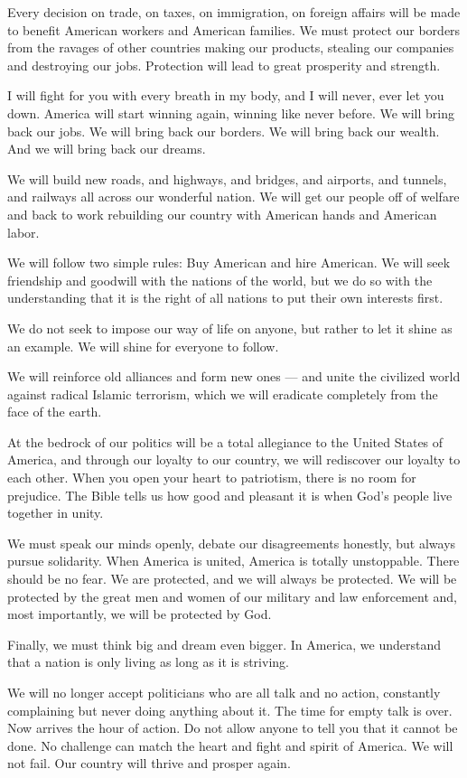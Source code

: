 \documentclass[10pt,a4paper]{article}
\begin{document}
Every decision on trade, on taxes, on immigration, on foreign affairs will be made to benefit American workers and American families. We must protect our borders from the ravages of other countries making our products, stealing our companies and destroying our jobs. Protection will lead to great prosperity and strength.

I will fight for you with every breath in my body, and I will never, ever let you down. America will start winning again, winning like never before. We will bring back our jobs. We will bring back our borders. We will bring back our wealth. And we will bring back our dreams.

We will build new roads, and highways, and bridges, and airports, and tunnels, and railways all across our wonderful nation. We will get our people off of welfare and back to work rebuilding our country with American hands and American labor.

We will follow two simple rules: Buy American and hire American. We will seek friendship and goodwill with the nations of the world, but we do so with the understanding that it is the right of all nations to put their own interests first.

We do not seek to impose our way of life on anyone, but rather to let it shine as an example. We will shine for everyone to follow.

We will reinforce old alliances and form new ones — and unite the civilized world against radical Islamic terrorism, which we will eradicate completely from the face of the earth.

At the bedrock of our politics will be a total allegiance to the United States of America, and through our loyalty to our country, we will rediscover our loyalty to each other. When you open your heart to patriotism, there is no room for prejudice. The Bible tells us how good and pleasant it is when God's people live together in unity.

We must speak our minds openly, debate our disagreements honestly, but always pursue solidarity. When America is united, America is totally unstoppable. There should be no fear. We are protected, and we will always be protected. We will be protected by the great men and women of our military and law enforcement and, most importantly, we will be protected by God.

Finally, we must think big and dream even bigger. In America, we understand that a nation is only living as long as it is striving.

We will no longer accept politicians who are all talk and no action, constantly complaining but never doing anything about it. The time for empty talk is over. Now arrives the hour of action. Do not allow anyone to tell you that it cannot be done. No challenge can match the heart and fight and spirit of America. We will not fail. Our country will thrive and prosper again.
\end{document}
